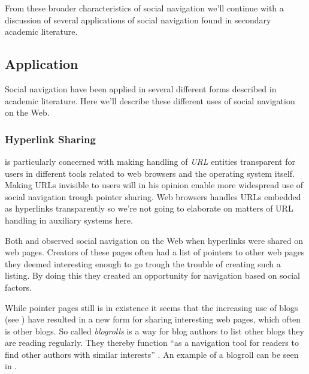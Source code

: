 
From these broader characteristics of social navigation we'll continue
with a discussion of several applications of social navigation found in
secondary academic literature.

\subsection{Application}

Social navigation have been applied in several different forms described in
academic literature. Here we'll describe these different uses of social
navigation on the Web.

\subsubsection{Hyperlink Sharing}

\citet{dieberger97} is particularly concerned with making handling of
\emph{URL}%
entities transparent for users in different tools related to web browsers and
the operating system itself. Making URLs invisible to users will in his
opinion enable more widespread use of social navigation trough pointer
sharing. Web browsers handles URLs embedded as hyperlinks
transparently so we're not going to elaborate on matters of URL handling in
auxiliary systems here.

Both \cite{dourish94} and \cite{dieberger97} observed social navigation on the
Web when hyperlinks were shared on web pages. Creators of these pages often
had a list of pointers to other web pages they deemed interesting enough to go
trough the trouble of creating such a listing. By doing this they created
an opportunity for navigation based on social factors.

While pointer pages still is in existence it seems that the increasing
use of blogs (see )
have resulted in a new form for sharing interesting web pages,
which often is other blogs. So called \emph{blogrolls} is a way for blog
authors to list other blogs they are reading regularly. They thereby function
``as a navigation tool for readers to find other authors with similar
interests'' \citep[p.~3]{marlow07}. An example of a blogroll can be seen in
.

